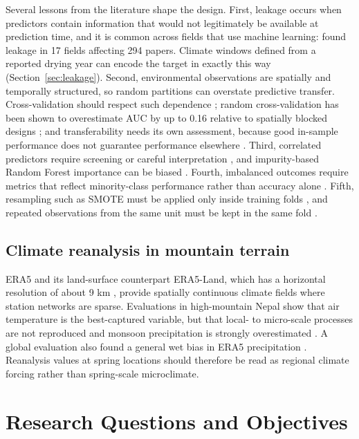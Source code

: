 \documentclass[12pt,a4paper]{article}
\begin{document}
Several lessons from the literature shape the design. First, leakage occurs when predictors contain information that would not legitimately be available at prediction time, and it is common across fields that use machine learning: \citet{kapoor2023} found leakage in 17 fields affecting 294 papers. Climate windows defined from a reported drying year can encode the target in exactly this way (Section~\ref{sec:leakage}). Second, environmental observations are spatially and temporally structured, so random partitions can overstate predictive transfer. Cross-validation should respect such dependence \citep{roberts2017}; random cross-validation has been shown to overestimate AUC by up to 0.16 relative to spatially blocked designs \citep{koldasbayeva2025}; and transferability needs its own assessment, because good in-sample performance does not guarantee performance elsewhere \citep{wenger2012}. Third, correlated predictors require screening or careful interpretation \citep{dormann2013}, and impurity-based Random Forest importance can be biased \citep{strobl2007}. Fourth, imbalanced outcomes require metrics that reflect minority-class performance rather than accuracy alone \citep{he2009,saito2015}. Fifth, resampling such as SMOTE \citep{chawla2002} must be applied only inside training folds \citep{santos2018}, and repeated observations from the same unit must be kept in the same fold \citep{john2025}.

\subsection{Climate reanalysis in mountain terrain}\label{sec:lit-reanalysis}

ERA5 \citep{hersbach2020} and its land-surface counterpart ERA5-Land, which has a horizontal resolution of about 9 km \citep{munozsabater2021}, provide spatially continuous climate fields where station networks are sparse. Evaluations in high-mountain Nepal show that air temperature is the best-captured variable, but that local- to micro-scale processes are not reproduced and monsoon precipitation is strongly overestimated \citep{khadka2022}. A global evaluation also found a general wet bias in ERA5 precipitation \citep{lavers2022}. Reanalysis values at spring locations should therefore be read as regional climate forcing rather than spring-scale microclimate.

\clearpage
\section{Research Questions and Objectives}\label{sec:rq}
\end{document}
